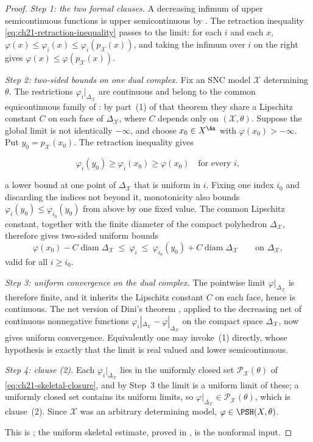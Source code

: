 \begin{proof}
\emph{Step 1: the two formal clauses.}
A decreasing infimum of upper semicontinuous functions is upper
semicontinuous by .  The retraction inequality
\eqref{eq:ch21-retraction-inequality} passes to the
limit: for each $i$ and each $x$, $\varphi(x)\leq\varphi_i(x)\leq
\varphi_i(p_{\mathcal X}(x))$, and taking the infimum over $i$ on the
right gives $\varphi(x)\leq\varphi(p_{\mathcal X}(x))$.

\emph{Step 2: two-sided bounds on one dual complex.}
Fix an SNC model $\mathcal X$ determining $\theta$.  The restrictions
$\varphi_i|_{\Delta_{\mathcal X}}$ are continuous and belong to the
common equicontinuous family of : by
part~(1) of that theorem they share a Lipschitz constant $C$ on each face
of $\Delta_{\mathcal X}$, where $C$ depends only on
$(\mathcal X,\theta)$.  Suppose
the global limit is not identically $-\infty$, and choose
$x_0\in X^{\An}$ with $\varphi(x_0)>-\infty$.  Put
$y_0=p_{\mathcal X}(x_0)$.  The retraction inequality gives

\[
        \varphi_i(y_0)\geq\varphi_i(x_0)\geq\varphi(x_0)
        \quad\text{for every }i,
\]

a lower bound at one point of $\Delta_{\mathcal X}$ that is uniform in
$i$.  Fixing one index $i_0$ and discarding the indices not beyond it,
monotonicity also bounds
$\varphi_i(y_0)\leq\varphi_{i_0}(y_0)$ from above by one fixed value.
The common Lipschitz constant, together with the finite diameter of the
compact polyhedron $\Delta_{\mathcal X}$, therefore gives two-sided
uniform bounds
\[
 \varphi(x_0)-C\operatorname{diam}\Delta_{\mathcal X}
 \ \leq\ \varphi_i\ \leq\
 \varphi_{i_0}(y_0)+C\operatorname{diam}\Delta_{\mathcal X}
 \qquad\text{on }\Delta_{\mathcal X},
\]
valid for all $i\geq i_0$.

\emph{Step 3: uniform convergence on the dual complex.}
The pointwise limit $\varphi|_{\Delta_{\mathcal X}}$ is therefore finite,
and it inherits the Lipschitz constant $C$ on each face, hence is
continuous.  The net version of Dini's theorem
, applied to the decreasing net of continuous
nonnegative functions
$\varphi_i|_{\Delta_{\mathcal X}}-
\varphi|_{\Delta_{\mathcal X}}$ on the compact space
$\Delta_{\mathcal X}$, now gives uniform convergence.  Equivalently one
may invoke \Cref{prop:dini-usc}\,(1) directly, whose hypothesis is exactly
that the limit is real valued and lower semicontinuous.

\emph{Step 4: clause \textup{(2)}.}
Each $\varphi_i|_{\Delta_{\mathcal X}}$ lies in the uniformly closed set
$\mathcal P_{\mathcal X}(\theta)$ of \eqref{eq:ch21-skeletal-closure}, and
by Step~3 the limit is a uniform limit of these; a uniformly closed set
contains its uniform limits, so
$\varphi|_{\Delta_{\mathcal X}}\in\mathcal P_{\mathcal X}(\theta)$, which
is clause~(2).  Since $\mathcal X$ was an arbitrary determining model,
$\varphi\in\PSH(X,\theta)$.

This is \cite[Corollary~7.9]{BFJ16}; the uniform
skeletal estimate, proved in , is the
nonformal input.
\end{proof}

